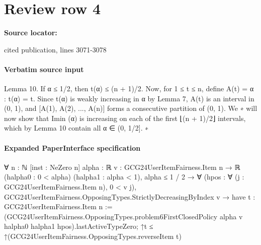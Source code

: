\documentclass[10pt]{article}
\begin{document}
\section*{Review row 4}
\textbf{Source locator:} {\footnotesize\raggedright cited publication, lines 3071-\allowbreak{}3078\par}
\paragraph{Verbatim source input}
\begin{ReviewVerbatim}
Lemma 10. If α ≤ 1/2, then t(α) ≤ (n + 1)/2.
Now, for 1 ≤ t ≤ n, define A(t) = {α : t(α) = t}. Since t(α) is weakly increasing in α by Lemma
7, A(t) is an interval in (0, 1), and [A(1), A(2), ..., A(n)] forms a consecutive partition of (0, 1). We
∗
will now show that Imin
(α) is increasing on each of the first ⌊(n + 1)/2⌋ intervals, which by Lemma
10 contain all α ∈ (0, 1/2].
∗
\end{ReviewVerbatim}



\paragraph{Expanded PaperInterface specification}
\begin{ReviewVerbatim}
∀ {n : ℕ} [inst : NeZero n] {alpha : ℝ} {v : GCG24UserItemFairness.Item n → ℝ} (halpha0 : 0 < alpha)
  (halpha1 : alpha < 1),
  alpha ≤ 1 / 2 →
    ∀ (hpos : ∀ (j : GCG24UserItemFairness.Item n), 0 < v j),
      GCG24UserItemFairness.OpposingTypes.StrictlyDecreasingByIndex v →
        have t : GCG24UserItemFairness.Item n :=
          (GCG24UserItemFairness.OpposingTypes.problem6FirstClosedPolicy alpha v halpha0 halpha1
              hpos).lastActiveTypeZero;
        ↑t ≤ ↑(GCG24UserItemFairness.OpposingTypes.reverseItem t)
\end{ReviewVerbatim}
\end{document}
